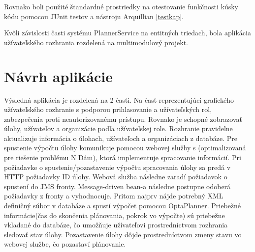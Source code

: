 Rovnako boli použité štandardné prostriedky na otestovanie funkčnosti kúsky kódu pomocou JUnit testov a nástroju Arquillian \ref{testkap}.

Kvôli závislosti časti systému PlannerService na entitných triedach, bola aplikácia užívateľského rozhrania rozdelená na multimodulový projekt.


\section{Návrh aplikácie}
Výsledná aplikácia je rozdelená na 2 časti. Na časť reprezentujúci grafického užívateľského rozhranie s podporou prihlasovanie a užívateľských rol, zabezpečenia proti neautorizovanému prístupu. Rovnako je schopné zobrazovať úlohy, užívateľov a organizácie podľa užívateľskej role. Rozhranie pravidelne aktualizuje informácia o úlohach, užívateľoch a organizáciach z databáze. Pre spustenie výpočtu úlohy komunikuje pomocou webovej služby s (optimalizovaná pre riešenie problému N Dám), ktorá implementuje spracovanie informácií. Pri požiadavke o spustenie/pozastavenie výpočtu spracovania úlohy sa predá v HTTP požiadavky ID úlohy. Webová služba následne zaradí požiadavok o spustení do JMS fronty. Message-driven bean-a následne postupne odoberá požiadavky z fronty a vyhodnocuje. Pritom najprv nájde potrebný XML definičný súbor v databáze a spustí výpočet pomocou OptaPlanner. Priebežné informácie(čas do skončenia plánovania, pokrok vo výpočte) sú priebežne vkladané do databáze, čo umožňuje užívateľovi prostredníctvom rozhrania sledovať stav úlohy. Pozastavenie úlohy dôjde prostredníctvom zmeny stavu vo webovej službe, čo pozastaví plánovanie.


